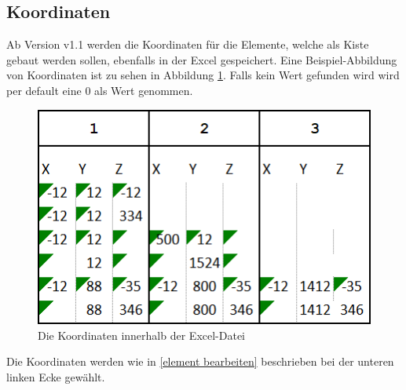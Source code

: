 \documentclass{book}
\begin{document}
		\subsection{Koordinaten}
			Ab Version v1.1 werden die Koordinaten für die Elemente, welche als Kiste gebaut werden sollen, ebenfalls in der Excel gespeichert. Eine Beispiel-Abbildung von Koordinaten ist zu sehen in Abbildung \ref{fig:koordinaten}. Falls kein Wert gefunden wird wird per default eine 0 als Wert genommen.
			\begin{figure}
				\centering
				\includegraphics[scale=0.48]{pics/excel/koordinaten.png}
				\caption{Die Koordinaten innerhalb der Excel-Datei}
				\label{fig:koordinaten}
			\end{figure}
			Die Koordinaten werden wie in \ref{element bearbeiten} beschrieben bei der unteren linken Ecke gewählt.
		
\end{document}
